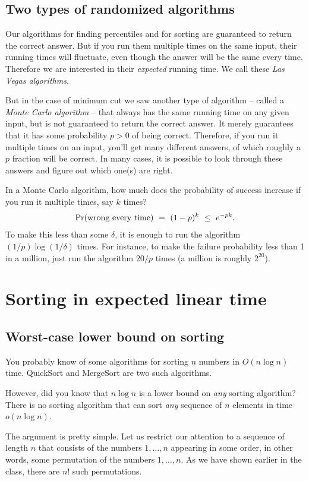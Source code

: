 \subsection{Two types of randomized algorithms}

Our algorithms for finding percentiles and for sorting are guaranteed to return 
the correct answer. But if you run them multiple times on the same input, their 
running times will fluctuate, even though the answer will be the same every time. 
Therefore we are interested in their {\it expected} running time. We call these 
{\it Las Vegas algorithms}.

But in the case of minimum cut we saw another type of algorithm -- called a 
{\it Monte Carlo algorithm} -- that always has the same running time on any 
given input, but is not guaranteed to return the correct answer. It merely 
guarantees that it has some probability $p > 0$ of being correct. Therefore, if 
you run it multiple times on an input, you'll get many different answers, of 
which roughly a $p$ fraction will be correct. In many cases, it is possible to
look through these answers and figure out which one(s) are right.

In a Monte Carlo algorithm, how much does the probability of success increase if you
run it multiple times, say $k$ times?
$$ \pr(\mbox{wrong every time}) \ = \ (1-p)^k \ \leq \ e^{-pk} .$$
To make this less than some $\delta$, it is enough to run the algorithm 
$(1/p) \log (1/\delta)$ times. For instance, to make the failure probability less than 
1 in a million, just run the algorithm $20/p$ times (a million is roughly $2^{20}$).

\section{Sorting in expected linear time}

\subsection{Worst-case lower bound on sorting}
You probably know of some algorithms for sorting $n$ numbers in
$O(n\log n)$ time. QuickSort and MergeSort are two such algorithms.

However, did you know that $n \log n$ is a lower bound on {\em any} sorting
algorithm? There is no sorting algorithm that can sort {\em any}
sequence of $n$ elements in time $o(n\log n)$. 

The argument is pretty simple. Let us restrict our attention to a
sequence of length $n$ that consists of the numbers $1,\ldots,n$
appearing in some order,  in other words, some permutation of the
numbers $1,\ldots,n$. As we have shown earlier in the class, there are
$n!$ such permutations.

